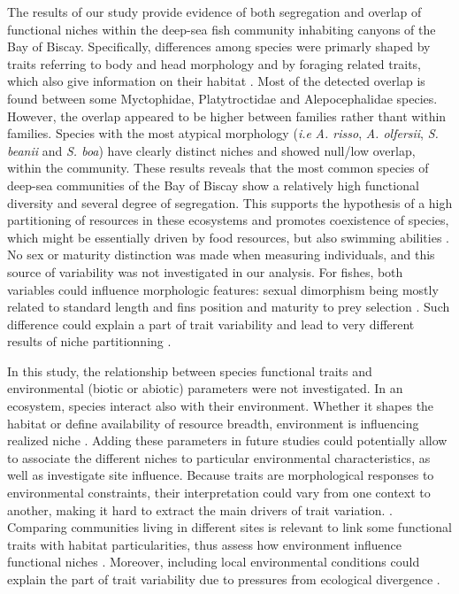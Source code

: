 
The results of our study provide evidence of both segregation and overlap of functional niches within the deep-sea fish community inhabiting canyons of the Bay of Biscay. Specifically, differences among species were primarly shaped by traits referring to body and head morphology and by foraging related traits, which also give information on their habitat \citep{schoenfuss2007}. Most of the detected overlap is found between some Myctophidae, Platytroctidae and Alepocephalidae species. However, the overlap appeared to be higher between families rather thant within families. Species with the most atypical morphology (\emph{i.e} \textit{A. risso}, \textit{A. olfersii}, \textit{S. beanii} and \textit{S. boa}) have clearly distinct niches and showed null/low overlap, within the community. These results reveals that the most common species of deep-sea communities of the Bay of Biscay show a relatively high functional diversity and several degree of segregation. This supports the hypothesis of a high partitioning of resources in these ecosystems and promotes coexistence of species, which might be essentially driven by food resources, but also swimming abilities \citep{aneeshkumar2017,preciado2017}.\\


No sex or maturity distinction was made when measuring individuals, and this source of variability was not investigated in our analysis. For fishes, both variables could influence morphologic features: sexual dimorphism being mostly related to standard length and fins position and maturity to prey selection \citep{geidner2008,nagelkerke2018}. Such difference could explain a part of trait variability and lead to very different results of niche partitionning \citep{dasilva2019,dumay2004,nagelkerke2018}.

In this study, the relationship between species functional traits and environmental (biotic or abiotic) parameters were not investigated. In an ecosystem, species interact also with their environment. Whether it shapes the habitat or define availability of resource breadth, environment is influencing realized niche \citep{costa-pereira2019,ibanez2007,kremer2017}. Adding these parameters in future studies could potentially allow to associate the different niches to particular environmental characteristics, as well as investigate site influence. Because traits are morphological responses to environmental constraints, their interpretation could vary from one context to another, making it hard to extract the main drivers of trait variation. \citep{kremer2017}. Comparing communities living in different sites is relevant to link some functional traits with habitat particularities, thus assess how environment influence functional niches \citep{mejri2009}. Moreover, including local environmental conditions could explain the part of trait variability due to pressures from ecological divergence \citep{dasilva2019}. 

